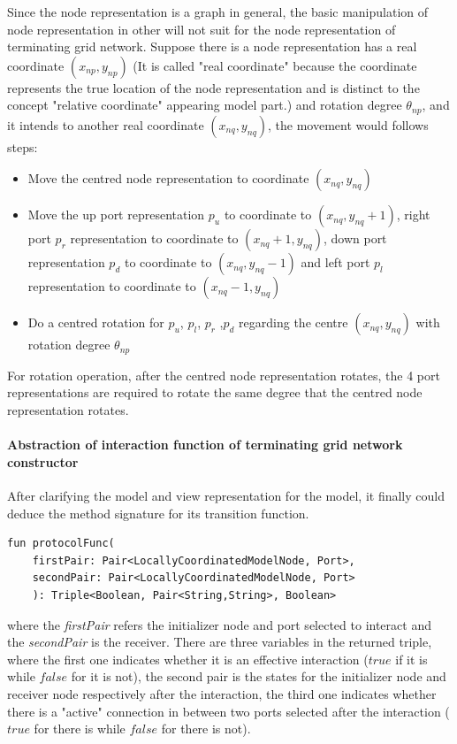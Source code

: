 \par\noindent
Since the node representation is a graph in general, the basic manipulation of node representation in other will not suit for the node representation of
terminating grid network. Suppose there is a node representation has a real coordinate $(x_{np}, y_{np})$ (It is called "real coordinate" because the coordinate represents the true
location of the node representation and is distinct to the concept "relative coordinate" appearing model part.) and rotation degree $\theta_{np}$, and it intends to
another real coordinate $(x_{nq}, y_{nq})$, the movement would follows steps:
\begin{itemize}
  \item Move the centred node representation to coordinate $(x_{nq}, y_{nq})$
  \item Move the up port representation $p_{u}$ to coordinate to $(x_{nq}, y_{nq} + 1)$, right port $p_{r}$ representation to coordinate to $(x_{nq} + 1, y_{nq})$,  down port representation $p_{d}$ to coordinate to $(x_{nq}, y_{nq} - 1)$
  and left port $p_{l}$ representation to coordinate to $(x_{nq} - 1, y_{nq})$
  \item Do a centred rotation for $p_{u}$, $p_{l}$, $p_{r}$ ,$p_{d}$ regarding the centre $(x_{nq}, y_{nq})$ with rotation degree $\theta_{np}$
\end{itemize}
For rotation operation, after the centred node representation rotates, the 4 port representations are required to rotate the same degree that the centred node representation rotates.

\paragraph{Abstraction of interaction function of terminating grid network constructor}
After clarifying the model and view representation for the model, it finally could deduce the method signature for its transition function.
\begin{lstlisting}[caption = {Abstraction for terminating grid network constructor interaction function}, style = mykotlin]
  fun protocolFunc(
    firstPair: Pair<LocallyCoordinatedModelNode, Port>,
    secondPair: Pair<LocallyCoordinatedModelNode, Port>
    ): Triple<Boolean, Pair<String,String>, Boolean>
\end{lstlisting}
where the \textit{firstPair} refers the initializer node and port selected to interact and the \textit{secondPair} is the receiver.
There are three variables in the returned triple, where the first one indicates whether it is an effective interaction ($true$ if it is while $false$ for it is not), the second pair is the states
for the initializer node and receiver node respectively after the interaction, the third one indicates whether there is a "active" connection
in between two ports selected after the interaction ($true$ for there is while $false$ for there is not).

